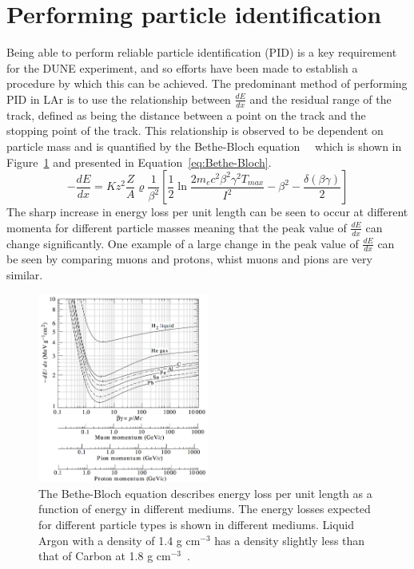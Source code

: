 \section{Performing particle identification}  \label{sec:PID} %
Being able to perform reliable particle identification (PID) is a key requirement for the DUNE experiment, and so efforts have been made to establish a procedure by which this can be achieved. The predominant method of performing PID in LAr is to use the relationship between $\frac{dE}{dx}$ and the residual range of the track, defined as being the distance between a point on the track and the stopping point of the track. This relationship is observed to be dependent on particle mass and is quantified by the Bethe-Bloch equation~\citep{Bethe}~\citep{Bloch} which is shown in Figure~\ref{fig:BetheBloch} and presented in Equation~\ref{eq:Bethe-Bloch}.
\begin{equation}
  \label{eq:Bethe-Bloch}
  -\frac{dE}{dx} = K z^2 \frac{Z}{A} \varrho \frac{1}{\beta^2} \left[ \frac{1}{2} \ln{\frac{2 m_e c^2 \beta^2 \gamma^2 T_{max}}{I^2}} - \beta^2 - \frac{\delta(\beta\gamma)}{2}\right]
\end{equation}
The sharp increase in energy loss per unit length can be seen to occur at different momenta for different particle masses meaning that the peak value of $\frac{dE}{dx}$ can change significantly. One example of a large change in the peak value of $\frac{dE}{dx}$ can be seen by comparing muons and protons, whist muons and pions are very similar. \\

\begin{figure}[h!]
  \centering
  \includegraphics[width=0.5\textwidth]{Bethe-Bloch}
  \caption[The medium and particle type dependence of the Bethe-Bloch equation]
          {The Bethe-Bloch equation describes energy loss per unit length as a function of energy in different mediums. The energy losses expected for different particle types is shown in different mediums. Liquid Argon with a density of 1.4 g cm$^{-3}$ has a density slightly less than that of Carbon at 1.8 g cm$^{-3}$~\citep{PDGReview}.}
  \label{fig:BetheBloch}
\end{figure}

